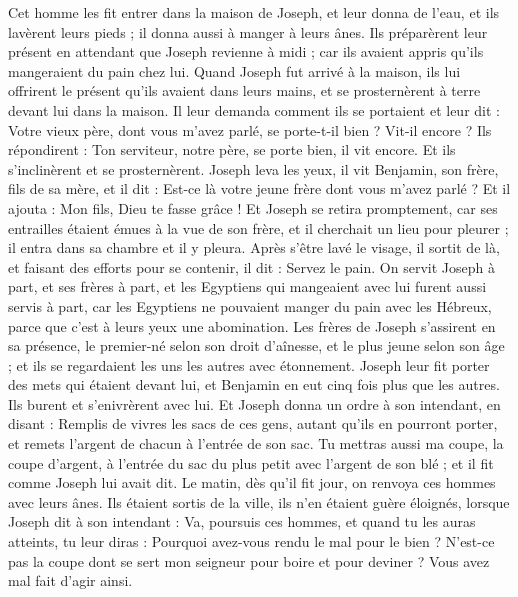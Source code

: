 \begin{multicols}{2}
Cet homme les fit entrer dans la maison de Joseph, et leur donna de l'eau, et ils lavèrent leurs pieds ; il donna aussi à manger à leurs ânes.
Ils préparèrent leur présent en attendant que Joseph revienne à midi ; car ils avaient appris qu'ils mangeraient du pain chez lui.
Quand  Joseph fut arrivé à la maison, ils lui offrirent le présent qu'ils avaient dans leurs mains, et se prosternèrent à terre devant lui dans la maison.
Il leur demanda comment ils se portaient et leur dit : Votre vieux père, dont vous m'avez parlé, se porte-t-il bien ? Vit-il encore ?
Ils répondirent : Ton serviteur, notre père, se porte bien, il vit encore. Et ils s’inclinèrent et se prosternèrent.
Joseph leva les yeux, il vit Benjamin, son frère, fils de sa mère, et il dit : Est-ce là votre jeune frère dont vous m'avez parlé ? Et il ajouta : Mon fils, Dieu te fasse grâce !
Et Joseph se retira promptement, car ses entrailles étaient émues à la vue de son frère, et il cherchait un lieu pour pleurer ; il entra dans sa chambre et il y pleura.
Après s’être lavé le visage, il sortit de là, et faisant des efforts pour se contenir, il dit : Servez le pain.
On servit Joseph à part, et ses frères à part, et les Egyptiens qui mangeaient avec lui furent aussi servis à part, car les Egyptiens ne pouvaient manger du pain avec les Hébreux,  parce que c’est à leurs yeux une abomination.
Les frères de Joseph s’assirent en sa présence, le premier-né selon son droit d’aînesse, et le plus jeune selon son âge ; et ils se regardaient les uns les autres avec étonnement.
Joseph leur fit porter des mets qui étaient devant lui, et Benjamin en eut cinq fois plus que les autres. Ils burent et s’enivrèrent  avec lui.
\VerseOne{}Et Joseph donna un ordre à son intendant, en disant : Remplis de vivres les sacs de ces gens, autant qu'ils en pourront porter, et remets l'argent de chacun à l’entrée de son sac.
Tu mettras aussi ma coupe, la coupe d'argent, à l’entrée du sac du plus petit avec l'argent de son blé ; et il fit comme Joseph lui avait dit.
Le matin, dès qu'il fit jour, on renvoya ces hommes avec leurs ânes.
Ils étaient sortis de la ville, ils n’en étaient guère éloignés, lorsque Joseph dit à son intendant : Va, poursuis ces hommes, et quand tu les auras atteints, tu leur diras : Pourquoi avez-vous rendu le mal pour le bien ?
N'est-ce pas la coupe dont se sert mon seigneur pour boire et pour deviner ? Vous avez mal fait d’agir ainsi.

\end{multicols}
